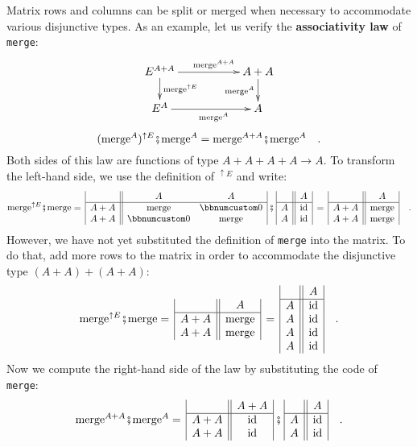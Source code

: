 Matrix rows and columns can be split or merged when necessary to accommodate
various disjunctive types. As an example, let us verify the \textbf{associativity
law} of \lstinline!merge!:
\[
\xymatrix{\xyScaleY{1.5pc}\xyScaleX{4.5pc}E^{A+A}\ar[d]\sp(0.45){\text{merge}^{\uparrow E}}\ar[r]\sp(0.55){\text{merge}^{A+A}} & A+A\ar[d]\sb(0.5){\text{merge}^{A}}\\
E^{A}\ar[r]\sb(0.55){\text{merge}^{A}} & A
}
\]
\[
(\text{merge}^{A})^{\uparrow E}\bef\text{merge}^{A}=\text{merge}^{A+A}\bef\text{merge}^{A}\quad.
\]
Both sides of this law are functions of type $A+A+A+A\rightarrow A$.
To transform the left-hand side, we use the definition of $^{\uparrow E}$
and write:
\[
\text{merge}^{\uparrow E}\bef\text{merge}=\,\begin{array}{|c||cc|}
 & A & A\\
\hline A+A & \text{merge} & \bbnum 0\\
A+A & \bbnum 0 & \text{merge}
\end{array}\,\bef\,\begin{array}{|c||c|}
 & A\\
\hline A & \text{id}\\
A & \text{id}
\end{array}\,=\,\begin{array}{|c||c|}
 & A\\
\hline A+A & \text{merge}\\
A+A & \text{merge}
\end{array}\quad.
\]
However, we have not yet substituted the definition of \lstinline!merge!
into the matrix. To do that, add more rows to the matrix in order
to accommodate the disjunctive type $(A+A)+(A+A)$:
\[
\text{merge}^{\uparrow E}\bef\text{merge}=\,\begin{array}{|c||c|}
 & A\\
\hline A+A & \text{merge}\\
A+A & \text{merge}
\end{array}\,=\,\begin{array}{|c||c|}
 & A\\
\hline A & \text{id}\\
A & \text{id}\\
A & \text{id}\\
A & \text{id}
\end{array}\quad.
\]
Now we compute the right-hand side of the law by substituting the
code of \lstinline!merge!:
\[
\text{merge}^{A+A}\bef\text{merge}^{A}=\,\begin{array}{|c||c|}
 & A+A\\
\hline A+A & \text{id}\\
A+A & \text{id}
\end{array}\,\bef\,\begin{array}{|c||c|}
 & A\\
\hline A & \text{id}\\
A & \text{id}
\end{array}\quad.
\]
